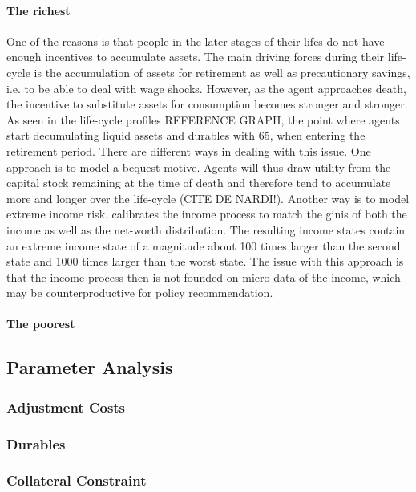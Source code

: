 \documentclass[a4paper,12pt]{article}
\begin{document}
\paragraph{The richest}
One of the reasons is that people in the later stages of their lifes do not have enough incentives to accumulate assets. The main driving forces during their life-cycle is the accumulation of assets for retirement as well as precautionary savings, i.e. to be able to deal with wage shocks. However, as the agent approaches death, the incentive to substitute assets for consumption becomes stronger and stronger. As seen in the life-cycle profiles REFERENCE GRAPH, the point where agents start decumulating liquid assets and durables with 65, when entering the retirement period. There are different ways in dealing with this issue. One approach is to model a bequest motive. Agents will thus draw utility from the capital stock remaining at the time of death and therefore tend to accumulate more and longer over the life-cycle (CITE DE NARDI!). Another way is to model extreme income risk. \citep{castaneda2003} calibrates the income process to match the ginis of both the income as well as the net-worth distribution. The resulting income states contain an extreme income state of a magnitude about 100 times larger than the second state and 1000 times larger than the worst state. The issue with this approach is that the income process then is not founded on micro-data of the income, which may be counterproductive for policy recommendation. 

\paragraph{The poorest}

\subsection{Parameter Analysis}
\subsubsection{Adjustment Costs}

\subsubsection{Durables}

\subsubsection{Collateral Constraint}
\end{document}
